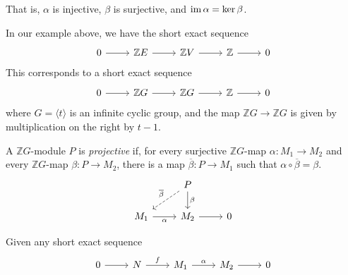 That is, \( \alpha \) is injective, \( \beta \) is surjective, and \( \operatorname{im} \alpha = \ker \beta \).
\begin{example}
    In our example above, we have the short exact sequence
\[\begin{tikzcd}
	0 & {\mathbb Z E} & {\mathbb Z V} & {\mathbb Z} & 0
	\arrow[from=1-1, to=1-2]
	\arrow[from=1-2, to=1-3]
	\arrow[from=1-3, to=1-4]
	\arrow[from=1-4, to=1-5]
\end{tikzcd}\]
    This corresponds to a short exact sequence
\[\begin{tikzcd}
	0 & {\mathbb Z G} & {\mathbb Z G} & {\mathbb Z} & 0
	\arrow[from=1-1, to=1-2]
	\arrow[from=1-2, to=1-3]
	\arrow[from=1-3, to=1-4]
	\arrow[from=1-4, to=1-5]
\end{tikzcd}\]
    where \( G = \langle t \rangle \) is an infinite cyclic group, and the map \( \mathbb Z G \to \mathbb Z G \) is given by multiplication on the right by \( t - 1 \).
\end{example}
\begin{definition}
    A \( \mathbb Z G \)-module \( P \) is \emph{projective} if, for every surjective \( \mathbb Z G \)-map \( \alpha : M_1 \to M_2 \) and every \( \mathbb Z G \)-map \( \beta : P \to M_2 \), there is a map \( \overline\beta : P \to M_1 \) such that \( \alpha \circ \overline \beta = \beta \).
\[\begin{tikzcd}
	& P \\
	{M_1} & {M_2} & 0
	\arrow["\beta", from=1-2, to=2-2]
	\arrow["\overline\beta"', dashed, from=1-2, to=2-1]
	\arrow["\alpha"', from=2-1, to=2-2]
	\arrow[from=2-2, to=2-3]
\end{tikzcd}\]
\end{definition}
Given any short exact sequence
\[\begin{tikzcd}
	0 & N & {M_1} & {M_2} & 0
	\arrow[from=1-1, to=1-2]
	\arrow["f", from=1-2, to=1-3]
	\arrow["\alpha", from=1-3, to=1-4]
	\arrow[from=1-4, to=1-5]
\end{tikzcd}\]
